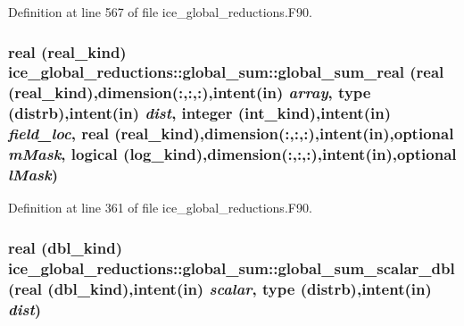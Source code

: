 Definition at line 567 of file ice\_\-global\_\-reductions.F90.\hypertarget{interfaceice__global__reductions_1_1global__sum_a73890257a8f46762fe99973c0b0f6e65}{
\subsubsection[{global\_\-sum\_\-real}]{\setlength{\rightskip}{0pt plus 5cm}real (real\_\-kind) ice\_\-global\_\-reductions::global\_\-sum::global\_\-sum\_\-real (real (real\_\-kind),dimension(:,:,:),intent(in) {\em array}, \/  type ({\bf distrb}),intent(in) {\em dist}, \/  integer (int\_\-kind),intent(in) {\em field\_\-loc}, \/  real (real\_\-kind),dimension(:,:,:),intent(in),optional {\em mMask}, \/  logical (log\_\-kind),dimension(:,:,:),intent(in),optional {\em lMask})}}
\label{interfaceice__global__reductions_1_1global__sum_a73890257a8f46762fe99973c0b0f6e65}


Definition at line 361 of file ice\_\-global\_\-reductions.F90.\hypertarget{interfaceice__global__reductions_1_1global__sum_a65b1ad99e12b8d3d726e1fb6f0ba4b59}{
\subsubsection[{global\_\-sum\_\-scalar\_\-dbl}]{\setlength{\rightskip}{0pt plus 5cm}real (dbl\_\-kind) ice\_\-global\_\-reductions::global\_\-sum::global\_\-sum\_\-scalar\_\-dbl (real (dbl\_\-kind),intent(in) {\em scalar}, \/  type ({\bf distrb}),intent(in) {\em dist})}}
\label{interfaceice__global__reductions_1_1global__sum_a65b1ad99e12b8d3d726e1fb6f0ba4b59}


